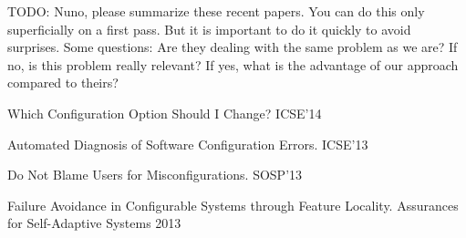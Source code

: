 TODO: Nuno, please summarize these recent papers.  You can do this
only superficially on a first pass.  But it is important to do it
quickly to avoid surprises.  Some questions: Are they dealing with the
same problem as we are?  If no, is this problem really relevant?  If
yes, what is the advantage of our approach compared to theirs?

Which Configuration Option Should I Change?  ICSE'14

Automated Diagnosis of Software Configuration Errors.  ICSE'13

Do Not Blame Users for Misconfigurations.  SOSP'13

Failure Avoidance in Configurable Systems through Feature Locality. Assurances for Self-Adaptive Systems 2013
